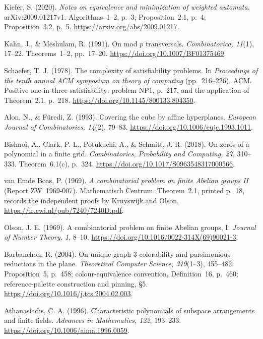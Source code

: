Kiefer, S. (2020). \emph{Notes on equivalence and minimization of weighted automata}. arXiv:2009.01217v1. Algorithms~1--2, p.~3; Proposition~2.1, p.~4; Proposition~3.2, p.~5. \url{https://arxiv.org/abs/2009.01217}.

Kahn, J., \& Meshulam, R. (1991). On mod $p$ transversals. \emph{Combinatorica, 11}(1), 17--22. Theorems~1--2, pp.~17--20. \url{https://doi.org/10.1007/BF01375469}.

Schaefer, T. J. (1978). The complexity of satisfiability problems. In \emph{Proceedings of the tenth annual ACM symposium on theory of computing} (pp.~216--226). ACM. Positive one-in-three satisfiability: problem NP1, p.~217, and the application of Theorem~2.1, p.~218. \url{https://doi.org/10.1145/800133.804350}.

Alon, N., \& F\"uredi, Z. (1993). Covering the cube by affine hyperplanes. \emph{European Journal of Combinatorics, 14}(2), 79--83. \url{https://doi.org/10.1006/eujc.1993.1011}.

Bishnoi, A., Clark, P. L., Potukuchi, A., \& Schmitt, J. R. (2018). On zeros of a polynomial in a finite grid. \emph{Combinatorics, Probability and Computing, 27}, 310--333. Theorem~6.1(c), p.~324. \url{https://doi.org/10.1017/S0963548317000566}.

van Emde Boas, P. (1969). \emph{A combinatorial problem on finite Abelian groups II} (Report ZW~1969-007). Mathematisch Centrum. Theorem~2.1, printed p.~18, records the independent proofs by Kruyswijk and Olson. \url{https://ir.cwi.nl/pub/7240/7240D.pdf}.

Olson, J. E. (1969). A combinatorial problem on finite Abelian groups, I. \emph{Journal of Number Theory, 1}, 8--10. \url{https://doi.org/10.1016/0022-314X(69)90021-3}.

Barbanchon, R. (2004). On unique graph 3-colorability and parsimonious reductions in the plane. \emph{Theoretical Computer Science, 319}(1--3), 455--482. Proposition~5, p.~458; colour-equivalence convention, Definition~16, p.~460; reference-palette construction and pinning, \S5. \url{https://doi.org/10.1016/j.tcs.2004.02.003}.

Athanasiadis, C. A. (1996). Characteristic polynomials of subspace arrangements and finite fields. \emph{Advances in Mathematics, 122}, 193--233. \url{https://doi.org/10.1006/aima.1996.0059}.

